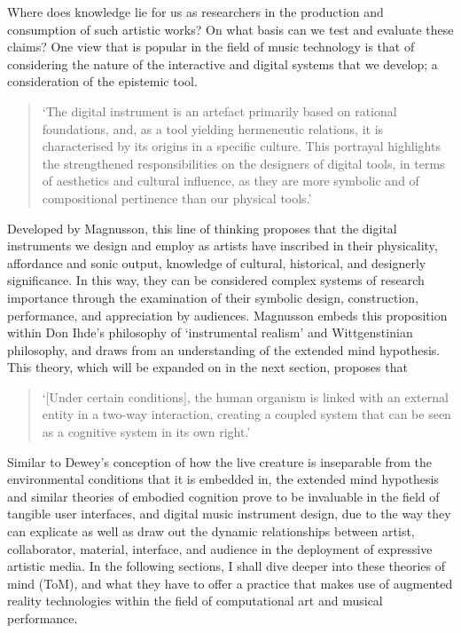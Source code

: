 Where does knowledge lie for us as researchers in the production and consumption of such artistic works? On what basis can we test and evaluate these claims? One view that is popular in the field of music technology is that of considering the nature of the interactive and digital systems that we develop; a consideration of the epistemic tool. 
\begin{quote}
    `The digital instrument is an artefact primarily based on rational foundations, and, as a tool yielding hermeneutic relations, it is characterised by its origins in a specific culture. This portrayal highlights the strengthened responsibilities on the designers of digital tools, in terms of aesthetics and cultural influence, as they are more symbolic and of compositional pertinence than our physical tools.' \citep[p. 335]{magnusson2009a} 
\end{quote}

Developed by Magnusson, this line of thinking proposes that the digital instruments we design and employ as artists have inscribed in their physicality, affordance and sonic output, knowledge of cultural, historical, and designerly significance. In this way, they can be considered complex systems of research importance through the examination of their symbolic design, construction, performance, and appreciation by audiences. Magnusson embeds this proposition within Don Ihde's philosophy of `instrumental realism' and Wittgenstinian philosophy, and draws from an understanding of the extended mind hypothesis. This theory, which will be expanded on in the next section, proposes that 
\begin{quote}
    `[Under certain conditions], the human organism is linked with an external entity in a two-way interaction, creating a coupled system that can be seen as a cognitive system in its own right.' \citep[p. 7]{clark1998}
\end{quote}


Similar to Dewey's conception of how the live creature is inseparable from the environmental conditions that it is embedded in, the extended mind hypothesis and similar theories of embodied cognition prove to be invaluable in the field of tangible user interfaces, and digital music instrument design, due to the way they can explicate as well as draw out the dynamic relationships between artist, collaborator, material, interface, and audience in the deployment of expressive artistic media. In the following sections, I shall dive deeper into these theories of mind (ToM), and what they have to offer a practice that makes use of augmented reality technologies within the field of computational art and musical performance.

